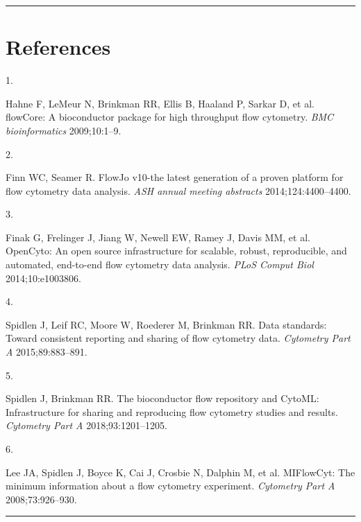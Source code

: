 \documentclass[
]{article}
\newlength{\cslhangindent}
\newlength{\csllabelwidth}
\newenvironment{CSLReferences}[2] %
 {\begin{list}{}{%
  \setlength{\itemindent}{0pt}
  \setlength{\leftmargin}{0pt}
  \setlength{\parsep}{0pt}
  \ifodd #1
   \setlength{\leftmargin}{\cslhangindent}
   \setlength{\itemindent}{-1\cslhangindent}
  \fi
  \setlength{\itemsep}{#2\baselineskip}}}
 {\end{list}}
\newcommand{\CSLLeftMargin}[1]{\parbox[t]{\csllabelwidth}{\strut#1\strut}}
\newcommand{\CSLRightInline}[1]{\parbox[t]{\linewidth - \csllabelwidth}{\strut#1\strut}}
\begin{document}
\begin{center}\rule{0.5\linewidth}{0.5pt}\end{center}

\section{References}\label{references}

\label{refs}
\begin{CSLReferences}{0}{0}
\CSLLeftMargin{1. }%
\CSLRightInline{Hahne F, LeMeur N, Brinkman RR, Ellis B, Haaland P,
Sarkar D, et al. flowCore: A bioconductor package for high throughput
flow cytometry. \emph{BMC bioinformatics} 2009;10:1--9.}

\CSLLeftMargin{2. }%
\CSLRightInline{Finn WC, Seamer R. FlowJo v10-the latest generation of a
proven platform for flow cytometry data analysis. \emph{ASH annual
meeting abstracts} 2014;124:4400--4400.}

\CSLLeftMargin{3. }%
\CSLRightInline{Finak G, Frelinger J, Jiang W, Newell EW, Ramey J, Davis
MM, et al. OpenCyto: An open source infrastructure for scalable, robust,
reproducible, and automated, end-to-end flow cytometry data analysis.
\emph{PLoS Comput Biol} 2014;10:e1003806.}

\CSLLeftMargin{4. }%
\CSLRightInline{Spidlen J, Leif RC, Moore W, Roederer M, Brinkman RR.
Data standards: Toward consistent reporting and sharing of flow
cytometry data. \emph{Cytometry Part A} 2015;89:883--891.}

\CSLLeftMargin{5. }%
\CSLRightInline{Spidlen J, Brinkman RR. The bioconductor flow repository
and CytoML: Infrastructure for sharing and reproducing flow cytometry
studies and results. \emph{Cytometry Part A} 2018;93:1201--1205.}

\CSLLeftMargin{6. }%
\CSLRightInline{Lee JA, Spidlen J, Boyce K, Cai J, Crosbie N, Dalphin M,
et al. MIFlowCyt: The minimum information about a flow cytometry
experiment. \emph{Cytometry Part A} 2008;73:926--930.}

\end{CSLReferences}

\begin{center}\rule{0.5\linewidth}{0.5pt}\end{center}
\end{document}
